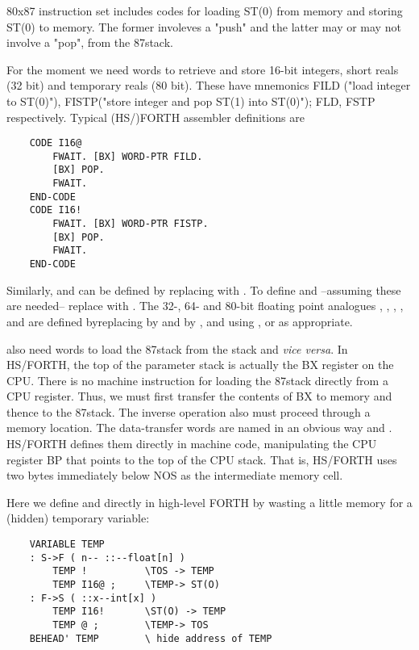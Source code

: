  80x87 instruction set includes codes for loading ST(0) from memory and storing ST(0) to memory. The former involeves a "push" and the latter may or may not involve a "pop", from
the 87stack.

For the moment we need words to retrieve and store 16-bit integers, short reals (32 bit) and temporary reals (80 bit). These have mnemonics FILD ("load integer to ST(0)"), FISTP("store integer and pop ST(1) into ST(0)"); FLD, FSTP respectively. Typical (HS/)FORTH assembler definitions are

\begin{lstlisting}
    CODE I16@
        FWAIT. [BX] WORD-PTR FILD.
        [BX] POP.
        FWAIT.
    END-CODE
    CODE I16!
        FWAIT. [BX] WORD-PTR FISTP.
        [BX] POP.
        FWAIT.
    END-CODE
\end{lstlisting}

Similarly,  and  can be defined by replacing  with . To define  and  --assuming these are needed-- replace  with . The 32-, 64- and 80-bit floating point analogues , , , ,  and  are defined byreplacing  by  and  by , and using ,  or  as appropriate.

 also need words to load the 87stack from the stack and \textit{vice versa}. In HS/FORTH, the top of the parameter stack is actually the BX register on the CPU. There is no machine instruction for loading the 87stack directly from a CPU register. Thus, we must first transfer the contents of BX to memory and thence to the 87stack. The inverse operation also must proceed through a memory location. The data-transfer words are named in an obvious way  and . HS/FORTH defines them directly in machine code, manipulating the CPU register BP that points to the top of the CPU stack. That is, HS/FORTH uses two bytes immediately below NOS as the intermediate memory cell.

Here we define  and  directly in high-level FORTH by wasting a little memory for a (hidden) temporary variable:

\begin{lstlisting}
    VARIABLE TEMP
    : S->F ( n-- ::--float[n] )
        TEMP !          \TOS -> TEMP
        TEMP I16@ ;     \TEMP-> ST(O)
    : F->S ( ::x--int[x] )
        TEMP I16!       \ST(O) -> TEMP
        TEMP @ ;        \TEMP-> TOS
    BEHEAD' TEMP        \ hide address of TEMP
\end{lstlisting}


